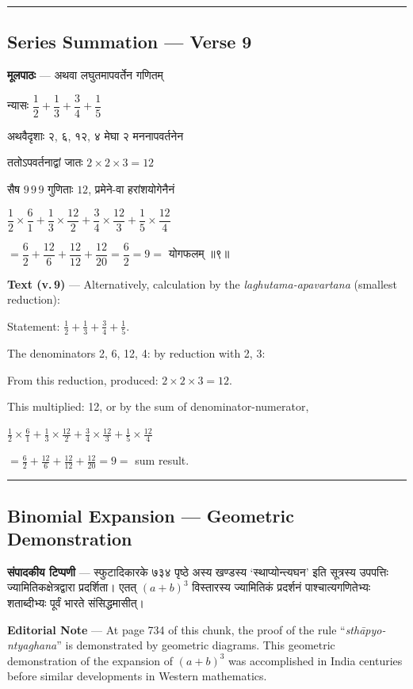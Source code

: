 \documentclass[11pt,a4paper]{article}
\newcommand{\skt}[1]{{\devanagarifont\color{sktcolor} #1}}
\newenvironment{bilingual}{%
  \par\noindent
  \begin{minipage}[t]{0.47\textwidth}%
}{%
  \par\end{minipage}%
}
\newcommand{\rightcol}{%
  \par\end{minipage}%
  \hfill
  \begin{minipage}[t]{0.47\textwidth}%
}
\begin{document}
\medskip
\noindent\rule{\textwidth}{0.4pt}

\subsection*{Series Summation --- Verse 9}

\begin{bilingual}
\textbf{मूलपाठः} --- \skt{अथवा लघुतमापवर्तेन गणितम्}

\skt{न्यासः} $\dfrac{1}{2} + \dfrac{1}{3} + \dfrac{3}{4} + \dfrac{1}{5}$

\skt{अथवैदृशाः २, ६, १२, ४ मेघा २ मननापवर्तनेन}

\skt{ततोऽपवर्तनाद्वां जातः} $2 \times 2 \times 3 = 12$

\skt{सैष} $9\,9\,9$ \skt{गुणिताः} $12$, \skt{प्रमेने-वा हरांशयोगेनैनं}

$\dfrac{1}{2} \times \dfrac{6}{1} + \dfrac{1}{3} \times \dfrac{12}{2} + \dfrac{3}{4} \times \dfrac{12}{3} + \dfrac{1}{5} \times \dfrac{12}{4}$

$= \dfrac{6}{2} + \dfrac{12}{6} + \dfrac{12}{12} + \dfrac{12}{20} = \dfrac{6}{2} = 9 = $ \skt{योगफलम्} ॥९॥
\rightcol
\textbf{Text (v.\,9)} --- Alternatively, calculation by the \textit{laghutama-apavartana} (smallest reduction):

Statement: $\frac{1}{2} + \frac{1}{3} + \frac{3}{4} + \frac{1}{5}$.

The denominators 2, 6, 12, 4: by reduction with 2, 3:

From this reduction, produced: $2 \times 2 \times 3 = 12$.

This multiplied: 12, or by the sum of denominator-numerator,

$\frac{1}{2} \times \frac{6}{1} + \frac{1}{3} \times \frac{12}{2} + \frac{3}{4} \times \frac{12}{3} + \frac{1}{5} \times \frac{12}{4}$

$= \frac{6}{2} + \frac{12}{6} + \frac{12}{12} + \frac{12}{20} = 9 = $ sum result.
\end{bilingual}

\medskip
\noindent\rule{\textwidth}{0.4pt}

\subsection*{Binomial Expansion --- Geometric Demonstration}

\begin{bilingual}
\textbf{संपादकीय टिप्पणी} --- \skt{स्फुटादिकारके ७३४ पृष्ठे अस्य खण्डस्य `स्थाप्योन्त्यघन' इति सूत्रस्य उपपत्तिः ज्यामितिकक्षेत्रद्वारा प्रदर्शिता। एतत् $(a+b)^3$ विस्तारस्य ज्यामितिकं प्रदर्शनं पाश्चात्यगणितेभ्यः शताब्दीभ्यः पूर्वं भारते संसिद्धमासीत्।}
\rightcol
\textbf{Editorial Note} --- At page 734 of this chunk, the proof of the rule ``\textit{sthāpyo-ntyaghana}'' is demonstrated by geometric diagrams. This geometric demonstration of the expansion of $(a+b)^3$ was accomplished in India centuries before similar developments in Western mathematics.
\end{bilingual}
\end{document}

